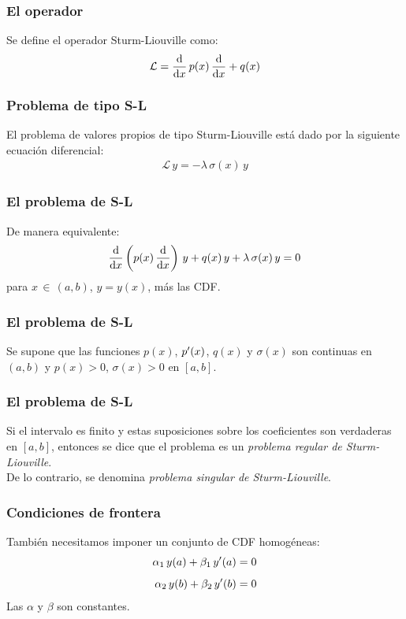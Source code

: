 \documentclass[12pt]{beamer}
\begin{document}
\begin{frame}
\frametitle{El operador}
Se define el operador Sturm-Liouville como:
\pause
\begin{align}
\mathcal{L} = \dv{x} \, p(x) \, \dv{x} + q(x)
\label{eq:ecuacion_04_02}
\end{align}
\end{frame}
\begin{frame}
\frametitle{Problema de tipo S-L}
El problema de valores propios de tipo Sturm-Liouville está dado por la siguiente ecuación diferencial:
\pause
\begin{align*}
\mathcal{L} \, y = - \lambda \, \sigma(x) \, y
\end{align*}
\end{frame}
\begin{frame}
\frametitle{El problema de S-L}
De manera equivalente:
\pause
\begin{align}
\dv{x} \left( p(x) \, \dv{x} \right) \, y + q(x) \, y + \lambda \, \sigma (x) \, y = 0
\label{eq:ecuacion_04_03}
\end{align}
para $x \, \in \, (a, b)$, $y = y (x)$, más las CDF.
\end{frame}
\begin{frame}
\frametitle{El problema de S-L}    
Se supone que las funciones $p (x)$, ${p}^{\prime} (x)$, $q (x)$ y $\sigma (x)$ son continuas en $(a, b)$ y $p (x) > 0$, $\sigma (x) > 0$ en $[a , b]$.
\end{frame}
\begin{frame}
\frametitle{El problema de S-L}    
Si el intervalo es finito y estas suposiciones sobre los coeficientes son verdaderas en $[a, b]$, entonces se dice que el problema es un \emph{problema regular de Sturm-Liouville}.
\\
\bigskip
\pause
De lo contrario, se denomina \emph{problema singular de Sturm-Liouville}.
\end{frame}
\begin{frame}
\frametitle{Condiciones de frontera}
También necesitamos imponer un conjunto de CDF homogéneas:
\pause
\begin{align}
\begin{aligned}
\alpha_{1} \, y(a) + \beta_{1} \, {y}^{\prime} (a) &= 0 \\[0.5em]
\alpha_{2} \, y(b) + \beta_{2} \, {y}^{\prime} (b) &= 0
\end{aligned}
\label{eq:ecuacion_04_04}
\end{align}
Las $\alpha$ y $\beta$ son constantes.
\end{frame}
\end{document}

